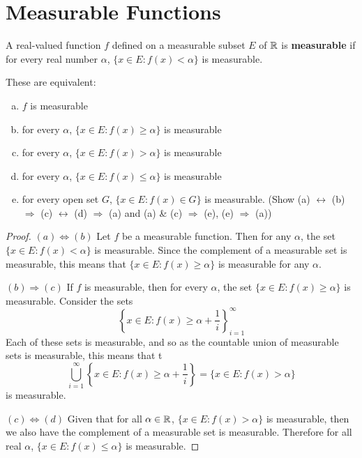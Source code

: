 \chapter{Measurable Functions}
\begin{defn}%
	A real-valued function $f$ defined on a measurable subset $E$ of $\mathbb{R}$ is 
	\textbf{measurable} if for every real number $\alpha$, 
	$\{x \in E: f(x) < \alpha\}$ is measurable. 
\end{defn}

\begin{pblm}%
	These are equivalent: 
	\begin{enumerate}[(a)]
	\item $f$ is measurable %
	\item for every $\alpha$, $\{x \in E: f(x) \ge \alpha\}$ is measurable %
	\item for every $\alpha$, $\{x \in E: f(x) > \alpha\}$ is measurable %
	\item for every $\alpha$, $\{x \in E: f(x) \le \alpha\}$ is measurable %
	\item for every open set $G$, $\{x \in E: f(x) \in G\}$ is measurable. %
	(Show (a) $\leftrightarrow$ (b) $\Rightarrow$ (c) $\leftrightarrow$ (d) 
	$\Rightarrow$ (a) and (a) \& (c) $\Rightarrow$ (e), (e) $\Rightarrow$ (a))
	\end{enumerate}
\begin{proof}
	\noindent $(a) \Leftrightarrow (b)$ Let $f$ be a measurable function. Then for 
	any $\alpha$, the set $\{x \in E: f(x) < \alpha\}$ is measurable. Since the 
	complement of a measurable set is measurable, this means that $\{x \in E: f(x) \ge \alpha\}$ 
	is measurable for any $\alpha$. 

	\noindent $(b) \Rightarrow (c)$ 
	If $f$ is measurable, then for every $\alpha$, 
	the set $\{x \in E: f(x) \ge \alpha\}$ is measurable. Consider the sets 
	\begin{equation*}
		\left\{x \in E: f(x) \ge \alpha + \frac{1}{i}\right\}_{i=1}^\infty
	\end{equation*}
	Each of these sets is measurable, and so as the countable union of 
	measurable sets is measurable, this means that t
	\begin{equation*}
		\bigcup\limits_{i=1}^\infty \left\{x \in E : f(x) \ge \alpha + \frac{1}{i}\right\} 
		= \{x \in E: f(x) > \alpha\}
	\end{equation*}
	is measurable.

	\noindent $(c) \Leftrightarrow (d)$ Given that for all $\alpha \in \mathbb{R}$, 
	$\{x \in E: f(x) > \alpha\}$ is measurable, then we also have the complement 
	of a measurable set is measurable. Therefore for 
	all real $\alpha$, $\{x \in E: f(x) \le \alpha\}$ is measurable.  


\end{proof}
\end{pblm}
